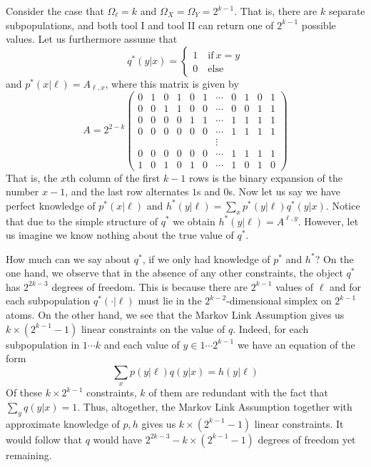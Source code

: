 Consider the case that $\Omega_\ell = k$ and $\Omega_X=\Omega_Y=2^{k-1}$.  That is, there are $k$ separate subpopulations, and both tool I and tool II can return one of $2^{k-1}$ possible values.  Let us furthermore assume that
\[
q^*(y|x)=\begin{cases}1 \quad \mathrm{if}\ x=y\\0\quad \mathrm{else}\end{cases}
\]
and  $p^*(x|\ell)=A_{\ell,x}$, where this matrix is given by
\[
A=2^{2-k}\left(\begin{array}{ccccccccccc}
0 & 1 & 0 & 1 & 0 & 1 & \cdots & 0 & 1 & 0 & 1\\
0 & 0 & 1 & 1 & 0 & 0 & \cdots & 0 & 0 & 1 & 1\\
0 & 0 & 0 & 0 & 1 & 1 & \cdots & 1 & 1 & 1 & 1\\
0 & 0 & 0 & 0 & 0 & 0 & \cdots & 1 & 1 & 1 & 1\\
 &  &  &  &  &  & \vdots\\
0 & 0 & 0 & 0 & 0 & 0 & \cdots & 1 & 1 & 1 & 1\\
1 & 0 & 1 & 0 & 1 & 0 & \cdots & 1 & 0 & 1 & 0
\end{array}\right)
\]
That is, the $x$th column of the first $k-1$ rows is the binary expansion of the number $x-1$, and the last row alternates $1$s and $0$s.  Now let us say we have perfect knowledge of $p^*(x|\ell)$ and $h^*(y|\ell)=\sum_x p^*(y|\ell)q^*(y|x)$.  Notice that due to the simple structure of $q^*$ we obtain $h^*(y|\ell)=A^{\ell,y}$.  However, let us imagine we know nothing about the true value of $q^*$.  

How much can we say about $q^*$, if we only had knowledge of $p^*$ and $h^*$?  On the one hand, we observe that in the absence of any other constraints, the object $q^*$ has $2^{2k-3}$ degrees of freedom.  This is because there are $2^{k-1}$ values of $\ell$ and for each subpopulation $q^*(\cdot|\ell)$ must lie in the $2^{k-2}$-dimensional simplex on $2^{k-1}$ atoms.  On the other hand, we see that the Markov Link Assumption gives us $k\times(2^{k-1}-1)$ linear constraints on the value of $q$.  Indeed, for each subpopulation in $1\cdots k$ and each value of $y \in 1 \cdots 2^{k-1}$ we have an equation of the form
\[
\sum_x p(y|\ell)q(y|x)=h(y|\ell)
\]
Of these $k\times2^{k-1}$ constraints, $k$ of them are redundant with the fact that $\sum_y q(y|x)=1$.  Thus, altogether, the Markov Link Assumption together with approximate knowledge of $p,h$ gives us $k\times(2^{k-1}-1)$ linear constraints.  It would follow that $q$ would have $2^{2k-3} - k\times(2^{k-1}-1)$ degrees of freedom yet remaining.  

